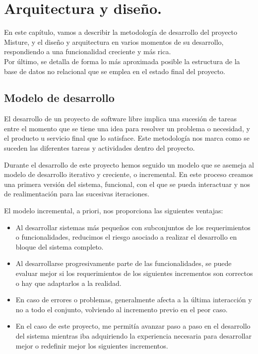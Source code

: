 \cleardoublepage
\chapter{Arquitectura y diseño.}
\label{chap:design_implement}

En este capítulo, vamos a describir la metodología de desarrollo del proyecto Misture, y el diseño y arquitectura en varios momentos de su desarrollo, respondiendo a una funcionalidad creciente y más rica.\\


Por último, se detalla de forma lo más aproximada posible la estructura de la base de datos no relacional que se emplea en el estado final del proyecto.\\


\section{Modelo de desarrollo} 
\label{subsec:modelo_desarrollo}

El desarrollo de un proyecto de software libre implica una sucesión de tareas entre el momento que se tiene una idea para resolver un problema o necesidad, y el producto u servicio final que lo satisface. Este metodología nos marca como se suceden las diferentes tareas y actividades dentro del proyecto.


Durante el desarrollo de este proyecto hemos seguido un modelo que se asemeja al modelo de desarrollo iterativo y creciente, o incremental.  En este proceso creamos una primera versión del sistema, funcional, con el que se pueda interactuar y nos de realimentación para las sucesivas iteraciones. \newpage	%




El modelo incremental, a priori, nos proporciona las siguientes ventajas:

\begin{itemize}
\item Al desarrollar sistemas más pequeños con subconjuntos de los requerimientos o funcionalidades, reducimos el riesgo asociado a realizar el desarrollo en bloque del sistema completo.

\item Al desarrollarse progresivamente parte de las funcionalidades, se puede evaluar mejor si los requerimientos de los siguientes incrementos son correctos o hay que adaptarlos a la realidad.

\item En caso de errores o problemas, generalmente afecta a la última interacción y no a todo el conjunto, volviendo al incremento previo en el peor caso.

\item En el caso de este proyecto, me permitía avanzar paso a paso en el desarrollo del sistema mientras iba adquiriendo la experiencia necesaria para desarrollar mejor o redefinir mejor los siguientes incrementos.
\end{itemize}



